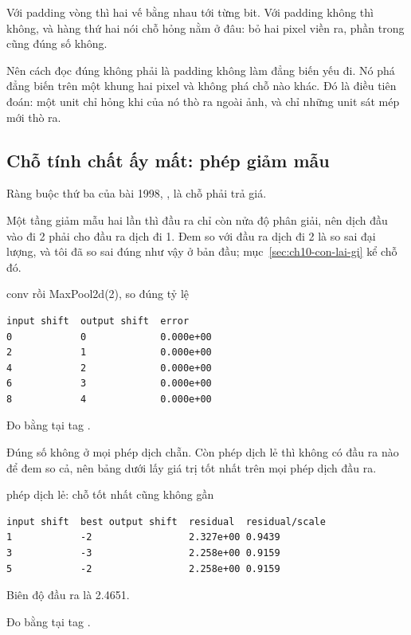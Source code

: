 Với padding vòng thì hai vế bằng nhau tới từng bit. Với padding không thì
không, và hàng thứ hai nói chỗ hỏng nằm ở đâu: bỏ hai pixel viền ra, phần trong
cũng đúng số không.

Nên cách đọc đúng không phải là padding không làm đẳng biến yếu đi. Nó phá đẳng
biến trên một khung hai pixel và không phá chỗ nào khác. Đó là điều
 tiên đoán: một unit chỉ hỏng khi
 của nó thò ra ngoài ảnh, và chỉ những
unit sát mép mới thò ra.

\subsection*{Chỗ tính chất ấy mất: phép giảm mẫu}

%
Ràng buộc thứ ba của bài 1998, , là chỗ phải trả giá.

Một tầng giảm mẫu hai lần thì đầu ra chỉ còn nửa độ phân giải, nên dịch đầu vào
đi 2 phải cho đầu ra dịch đi 1. Đem so với đầu ra dịch đi 2 là so sai đại
lượng, và tôi đã so sai đúng như vậy ở bản đầu; mục~\ref{sec:ch10-con-lai-gi}
kể chỗ đó.

\begin{measured}{conv rồi MaxPool2d(2), so đúng tỷ lệ}
\begin{verbatim}
input shift  output shift  error
0            0             0.000e+00
2            1             0.000e+00
4            2             0.000e+00
6            3             0.000e+00
8            4             0.000e+00
\end{verbatim}

Đo bằng  tại tag .
\end{measured}

Đúng số không ở mọi phép dịch chẵn. Còn phép dịch lẻ thì không có đầu ra nào để
đem so cả, nên bảng dưới lấy giá trị tốt nhất trên mọi phép dịch đầu ra.

\begin{measured}{phép dịch lẻ: chỗ tốt nhất cũng không gần}
\begin{verbatim}
input shift  best output shift  residual  residual/scale
1            -2                 2.327e+00 0.9439
3            -3                 2.258e+00 0.9159
5            -2                 2.258e+00 0.9159
\end{verbatim}

Biên độ đầu ra là 2.4651.

Đo bằng  tại tag .
\end{measured}

